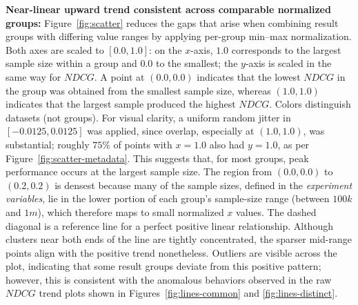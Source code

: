 \documentclass[sigconf,nonacm]{acmart}
\begin{document}
\textbf{Near-linear upward trend consistent across comparable normalized groups:} Figure~\ref{fig:scatter} reduces the gaps that arise when combining result groups with differing value ranges by applying per-group min--max normalization. Both axes are scaled to $[0.0, 1.0]$: on the $x$-axis, $1.0$ corresponds to the largest sample size within a group and $0.0$ to the smallest; the $y$-axis is scaled in the same way for $NDCG$. A point at $(0.0, 0.0)$ indicates that the lowest $NDCG$ in the group was obtained from the smallest sample size, whereas $(1.0, 1.0)$ indicates that the largest sample produced the highest $NDCG$. Colors distinguish datasets (not groups). For visual clarity, a uniform random jitter in $[-0.0125,0.0125]$ was applied, since overlap, especially at $(1.0, 1.0)$, was substantial; roughly $75\%$ of points with $x = 1.0$ also had $y = 1.0$, as per Figure~\ref{fig:scatter-metadata}. This suggests that, for most groups, peak performance occurs at the largest sample size. The region from $(0.0, 0.0)$ to $(0.2, 0.2)$ is densest because many of the sample sizes, defined in the \emph{experiment variables}, lie in the lower portion of each group's sample-size range (between $100k$ and $1m$), which therefore maps to small normalized $x$ values. The dashed diagonal is a reference line for a perfect positive linear relationship. Although clusters near both ends of the line are tightly concentrated, the sparser mid-range points align with the positive trend nonetheless. Outliers are visible across the plot, indicating that some result groups deviate from this positive pattern; however, this is consistent with the anomalous behaviors observed in the raw $NDCG$ trend plots shown in Figures~\ref{fig:lines-common} and \ref{fig:lines-distinct}.
\end{document}
